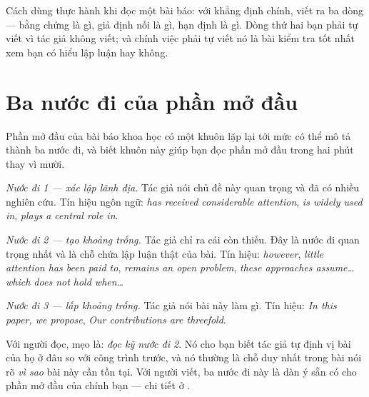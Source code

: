 \documentclass[../../english.tex]{subfiles}
\begin{document}
Cách dùng thực hành khi đọc một bài báo: với khẳng định chính, viết ra ba dòng --- bằng chứng là gì, giả định nối là gì, hạn định là gì. Dòng thứ hai bạn phải tự viết vì tác giả không viết; và chính việc phải tự viết nó là bài kiểm tra tốt nhất xem bạn có hiểu lập luận hay không.

\section{Ba nước đi của phần mở đầu}

Phần mở đầu của bài báo khoa học có một khuôn lặp lại tới mức có thể mô tả thành ba nước đi, và biết khuôn này giúp bạn đọc phần mở đầu trong hai phút thay vì mười.

\emph{Nước đi 1 --- xác lập lãnh địa.} Tác giả nói chủ đề này quan trọng và đã có nhiều nghiên cứu. Tín hiệu ngôn ngữ: \emph{has received considerable attention}, \emph{is widely used in}, \emph{plays a central role in}.

\emph{Nước đi 2 --- tạo khoảng trống.} Tác giả chỉ ra cái còn thiếu. Đây là nước đi quan trọng nhất và là chỗ chứa lập luận thật của bài. Tín hiệu: \emph{however}, \emph{little attention has been paid to}, \emph{remains an open problem}, \emph{these approaches assume\ldots{} which does not hold when\ldots}

\emph{Nước đi 3 --- lấp khoảng trống.} Tác giả nói bài này làm gì. Tín hiệu: \emph{In this paper, we propose}, \emph{Our contributions are threefold}.

Với người đọc, mẹo là: \emph{đọc kỹ nước đi 2}. Nó cho bạn biết tác giả tự định vị bài của họ ở đâu so với công trình trước, và nó thường là chỗ duy nhất trong bài nói rõ \emph{vì sao} bài này cần tồn tại. Với người viết, ba nước đi này là dàn ý sẵn có cho phần mở đầu của chính bạn --- chi tiết ở .

\begin{mauau}
\end{mauau}
\end{document}
